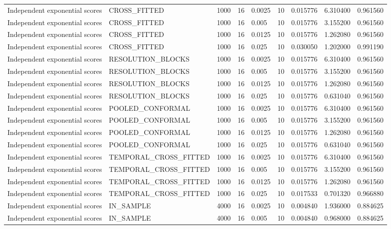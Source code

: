 \begin{tabular}{lllllllll}
Independent exponential scores & CROSS\_FITTED & 1000 & 16 & 0.0025 & 10 & 0.015776 & 6.310400 & 0.961560 \\
Independent exponential scores & CROSS\_FITTED & 1000 & 16 & 0.005 & 10 & 0.015776 & 3.155200 & 0.961560 \\
Independent exponential scores & CROSS\_FITTED & 1000 & 16 & 0.0125 & 10 & 0.015776 & 1.262080 & 0.961560 \\
Independent exponential scores & CROSS\_FITTED & 1000 & 16 & 0.025 & 10 & 0.030050 & 1.202000 & 0.991190 \\
Independent exponential scores & RESOLUTION\_BLOCKS & 1000 & 16 & 0.0025 & 10 & 0.015776 & 6.310400 & 0.961560 \\
Independent exponential scores & RESOLUTION\_BLOCKS & 1000 & 16 & 0.005 & 10 & 0.015776 & 3.155200 & 0.961560 \\
Independent exponential scores & RESOLUTION\_BLOCKS & 1000 & 16 & 0.0125 & 10 & 0.015776 & 1.262080 & 0.961560 \\
Independent exponential scores & RESOLUTION\_BLOCKS & 1000 & 16 & 0.025 & 10 & 0.015776 & 0.631040 & 0.961560 \\
Independent exponential scores & POOLED\_CONFORMAL & 1000 & 16 & 0.0025 & 10 & 0.015776 & 6.310400 & 0.961560 \\
Independent exponential scores & POOLED\_CONFORMAL & 1000 & 16 & 0.005 & 10 & 0.015776 & 3.155200 & 0.961560 \\
Independent exponential scores & POOLED\_CONFORMAL & 1000 & 16 & 0.0125 & 10 & 0.015776 & 1.262080 & 0.961560 \\
Independent exponential scores & POOLED\_CONFORMAL & 1000 & 16 & 0.025 & 10 & 0.015776 & 0.631040 & 0.961560 \\
Independent exponential scores & TEMPORAL\_CROSS\_FITTED & 1000 & 16 & 0.0025 & 10 & 0.015776 & 6.310400 & 0.961560 \\
Independent exponential scores & TEMPORAL\_CROSS\_FITTED & 1000 & 16 & 0.005 & 10 & 0.015776 & 3.155200 & 0.961560 \\
Independent exponential scores & TEMPORAL\_CROSS\_FITTED & 1000 & 16 & 0.0125 & 10 & 0.015776 & 1.262080 & 0.961560 \\
Independent exponential scores & TEMPORAL\_CROSS\_FITTED & 1000 & 16 & 0.025 & 10 & 0.017533 & 0.701320 & 0.966880 \\
Independent exponential scores & IN\_SAMPLE & 4000 & 16 & 0.0025 & 10 & 0.004840 & 1.936000 & 0.884625 \\
Independent exponential scores & IN\_SAMPLE & 4000 & 16 & 0.005 & 10 & 0.004840 & 0.968000 & 0.884625 \\

\end{tabular}
